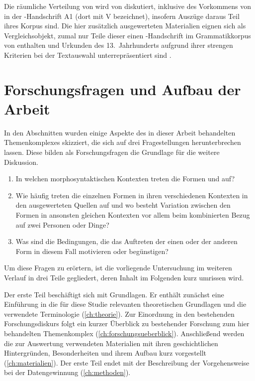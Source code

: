 Die räumliche Verteilung von  wird von
\citet[627--628]{ksw2} diskutiert, inklusive des Vorkommens von
 in der \KC{}-Handschrift A1 (dort mit V
bezeichnet), insofern Auszüge daraus Teil ihres Korpus sind. Die hier
zusätzlich ausgewerteten Materialien eignen sich als Vergleichsobjekt, zumal
nur Teile dieser einen \KC{}-Handschrift im Grammatikkorpus von
\citet{ksw3,ksw2} enthalten und Urkunden des 13.~Jahrhunderts aufgrund ihrer
strengen Kriterien bei der Textauswahl unterrepräsentiert sind
\autocite[1309, 1311]{wegera2000}.

\section{Forschungsfragen und Aufbau der Arbeit}

In den Abschnitten  wurden einige
Aspekte des in dieser Arbeit behandelten Themenkomplexes skizziert, die sich
auf drei Fragestellungen herunterbrechen lassen. Diese bilden als
Forschungsfragen die Grundlage für die weitere Diskussion.

\begin{enumerate}
	\item In welchen morphosyntaktischen Kontexten treten die Formen
		 und  auf?
	\item Wie häufig treten die einzelnen Formen in ihren verschiedenen
		Kontexten in den ausgewerteten Quellen auf und wo besteht Variation
		zwischen den Formen in ansonsten gleichen Kontexten vor allem beim
		kombinierten Bezug auf zwei Personen oder Dinge?
	\item Was sind die Bedingungen, die das Auftreten der einen oder der
		anderen Form in diesem Fall motivieren oder begünstigen?
\end{enumerate}

Um diese Fragen zu erörtern, ist die vorliegende Untersuchung im weiteren
Verlauf in drei Teile gegliedert, deren Inhalt im Folgenden kurz umrissen wird.

Der erste Teil beschäftigt sich mit Grundlagen. Er enthält zunächst eine
Einführung in die für diese Studie relevanten theoretischen Grundlagen und die
verwendete Terminologie (\cref{ch:theorie}). Zur Einordnung in den
bestehenden Forschungsdiskurs folgt ein kurzer Überblick zu bestehender
Forschung zum hier behandelten Themenkomplex (\cref{ch:forschungsueberblick}).
Anschließend werden die zur Auswertung verwendeten Materialien mit ihren
geschichtlichen Hintergründen, Besonderheiten und ihrem Aufbau kurz vorgestellt
(\cref{ch:materialien}). Der erste Teil endet mit der Beschreibung der
Vorgehensweise bei der Datengewinnung (\cref{ch:methoden}).

